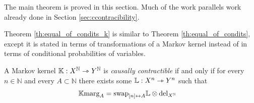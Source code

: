 The main theorem is proved in this section. Much of the work parallels work already done in Section \ref{sec:ccontracibility}.

Theorem \ref{th:equal_of_condits_k} is similar to Theorem \ref{th:equal_of_condits}, except it is stated in terms of transformations of a Markov kernel instead of in terms of conditional probabilities of variables.

\begin{theorem}\label{th:equal_of_condits_k}
A Markov kernel $\mathbb{K}:X^{\mathbb{N}}\rightarrowtriangle Y^{\mathbb{N}}$ is \emph{causally contractible} if and only if for every $n\in \mathbb{N}$ and every $A\subset\mathbb{N}$ there exists some $\mathbb{L}:X^n\rightarrowtriangle Y^n$ such that
\begin{align}
    \mathbb{K} \text{marg}_A &= \text{swap}_{[n]\leftrightarrow A} \mathbb{L}\otimes \text{del}_{X^{\mathbb{N}}}
\end{align}
\end{theorem}

